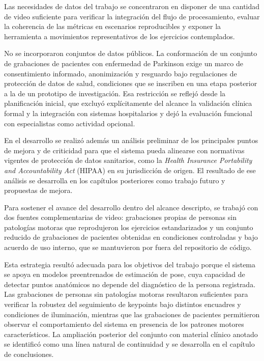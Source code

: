 Las necesidades de datos del trabajo se concentraron en disponer de una cantidad de video suficiente para verificar la integración del flujo de procesamiento, evaluar la coherencia de las métricas en escenarios reproducibles y exponer la herramienta a movimientos representativos de los ejercicios contemplados.

No se incorporaron conjuntos de datos públicos. La conformación de un conjunto de grabaciones de pacientes con enfermedad de Parkinson exige un marco de consentimiento informado, anonimización y resguardo bajo regulaciones de protección de datos de salud, condiciones que se inscriben en una etapa posterior a la de un prototipo de investigación. Esa restricción se reflejó desde la planificación inicial, que excluyó explícitamente del alcance la validación clínica formal y la integración con sistemas hospitalarios y dejó la evaluación funcional con especialistas como actividad opcional.

En el desarrollo se realizó además un análisis preliminar de los principales puntos de mejora y de criticidad para que el sistema pueda alinearse con normativas vigentes de protección de datos sanitarios, como la \textit{Health Insurance Portability and Accountability Act} (HIPAA) \citep{hipaa1996} en su jurisdicción de origen. El resultado de ese análisis se desarrolla en los capítulos posteriores como trabajo futuro y propuestas de mejora.

Para sostener el avance del desarrollo dentro del alcance descripto, se trabajó con dos fuentes complementarias de video: grabaciones propias de personas sin patologías motoras que reprodujeron los ejercicios estandarizados y un conjunto reducido de grabaciones de pacientes obtenidas en condiciones controladas y bajo acuerdo de uso interno, que se mantuvieron por fuera del repositorio de código.

Esta estrategia resultó adecuada para los objetivos del trabajo porque el sistema se apoya en modelos preentrenados de estimación de pose, cuya capacidad de detectar puntos anatómicos no depende del diagnóstico de la persona registrada. Las grabaciones de personas sin patologías motoras resultaron suficientes para verificar la robustez del seguimiento de keypoints bajo distintos encuadres y condiciones de iluminación, mientras que las grabaciones de pacientes permitieron observar el comportamiento del sistema en presencia de los patrones motores característicos. La ampliación posterior del conjunto con material clínico anotado se identificó como una línea natural de continuidad y se desarrolla en el capítulo de conclusiones.

